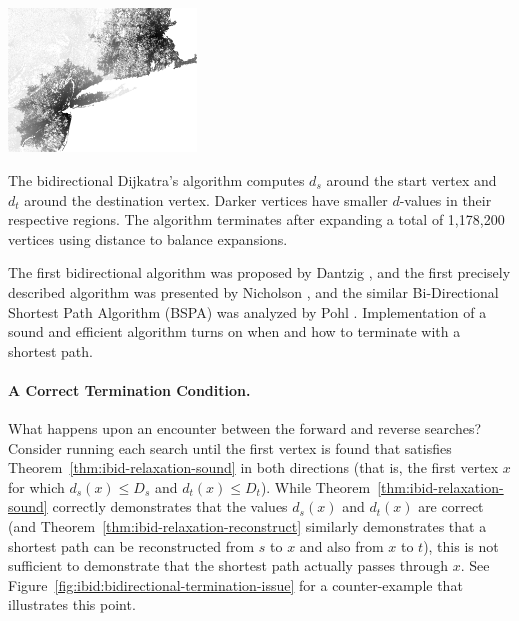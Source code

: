 \begin{marginfigure}%
   \centering%
   \includegraphics[width=5cm]{figs/incbi-road-ne/singleshot/example-bidijkstra.png}%
   \caption{The bidirectional Dijkatra's algorithm
      computes $d_s$ around the start vertex
      and $d_t$ around the destination vertex.
      Darker vertices have smaller $d$-values in their respective
      regions.
      The algorithm terminates after expanding a total of
      1,178,200 vertices using distance to balance expansions.}%
   \label{fig:ibid:example-bidirectional}%
\end{marginfigure}

The first bidirectional algorithm
was proposed by Dantzig \citep{dantzig1963linearprogramming},
and the first precisely described algorithm was presented by
Nicholson \citep{nicholson1966shortest},
and the similar Bi-Directional Shortest Path Algorithm (BSPA)
was analyzed by Pohl \citep{pohl1971bidirectional}.
Implementation of a sound and efficient algorithm
turns on when and how to terminate with a shortest path.

\paragraph{A Correct Termination Condition.}
What happens upon an encounter between the forward and reverse searches?
Consider running each search until the first vertex is found
that satisfies Theorem~\ref{thm:ibid-relaxation-sound} in both
directions
(that is, the first vertex $x$ for which
$d_s(x) \leq D_s$ and $d_t(x) \leq D_t$).
While Theorem~\ref{thm:ibid-relaxation-sound} correctly demonstrates
that the values $d_s(x)$ and $d_t(x)$ are correct
(and Theorem~\ref{thm:ibid-relaxation-reconstruct} similarly
demonstrates that a shortest path can be reconstructed from $s$ to $x$
and also from $x$ to $t$),
this is not sufficient to demonstrate that the shortest path
actually passes through $x$.
See Figure~\ref{fig:ibid:bidirectional-termination-issue} for a
counter-example that illustrates this point.

